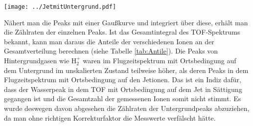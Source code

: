 \begin{center}
\begin{minipage}{\linewidth}
\centering
\texttt{[image: ../JetmitUntergrund.pdf]}%
 \label{fig:TOFJet}
\end{minipage} 
\end{center} 
Nähert man die Peaks mit einer Gaußkurve und integriert über diese, erhält man die Zählraten der einzelnen Peaks. Ist das Gesamtintegral des TOF-Spektrums bekannt, kann man daraus die Anteile der verschiedenen Ionen an der Gesamtverteilung berechnen (siehe Tabelle \ref{tab:Antile}). Die Peaks von Hintergrundgasen wie H$_2^+$ waren im Flugzeitspektrum mit Ortsbedingung auf dem Untergrund im unskalierten Zustand teilweise höher, als deren Peaks in dem Flugzeitspektrum mit Ortsbedingung auf den Jetionen. Das ist ein Indiz dafür, dass der Wasserpeak in dem TOF mit Ortsbedingung auf dem Jet in Sättigung gegangen ist und die Gesamtzahl der gemessenen Ionen somit nicht stimmt. Es wurde deswegen davon abgesehen die Zählraten der Untergrundpeaks abzuziehen, da man ohne richtigen Korrekturfaktor die Messwerte verfälscht hätte. 
%
